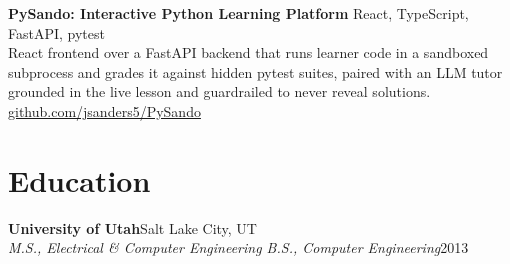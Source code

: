\documentclass[10.5pt, letterpaper]{article}
\newcommand{\jobentry}[4]{%
  \noindent
  \textbf{\color{accent}#1}\hfill\textcolor{muted}{\small #2}\\
  \textit{#3}\hfill\textcolor{muted}{\small #4}%
}
\begin{document}
\vspace{3pt}

\noindent\textbf{PySando: Interactive Python Learning Platform}
\hfill\textcolor{muted}{\small React, TypeScript, FastAPI, pytest}\\
React frontend over a FastAPI backend that runs learner code in a sandboxed
subprocess and grades it against hidden pytest suites, paired with an LLM tutor
grounded in the live lesson and guardrailed to never reveal solutions.
\hfill\textcolor{muted}{\small\href{https://github.com/jsanders5/PySando}{github.com/jsanders5/PySando}}

\section{Education}

\jobentry{University of Utah}{Salt Lake City, UT}%
  {M.S., Electrical \& Computer Engineering \enspace\textbullet\enspace
   B.S., Computer Engineering}{2013}
\end{document}
